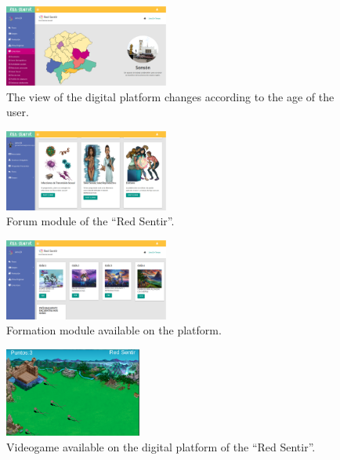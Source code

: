 \documentclass[journal,transmag]{IEEEtran}
\begin{document}
\begin{figure}[tbp]
\centering
\includegraphics[width=0.48\textwidth]{mayor.eps}
\caption{The view of the digital platform changes according to the age of the user.}
\label{fig:vista_plataforma}
\end{figure}



\begin{figure}[tbp]
\centering
\includegraphics[width=0.48\textwidth]{foros.eps}
\caption{Forum module of the ``Red Sentir''.}
\label{fig:foros}
\end{figure}

\begin{figure}[tbp]
\centering
\includegraphics[width=0.48\textwidth]{guias.eps}
\caption{Formation module available on the platform.}
\label{fig:formacion}
\end{figure}

\begin{figure}[t]
\centering
\includegraphics[width=0.4\textwidth]{juego2.eps}
\caption{Videogame available on the digital platform of the ``Red Sentir''.}
\label{fig:juegos}
\end{figure}
\end{document}
